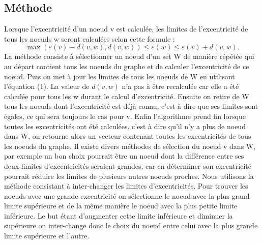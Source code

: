\documentclass[11pt]{article}
\begin{document}
\subsection{Méthode}
Lorsque l'excentricité d'un noeud v est calculée, les limites de l'excentricité
de tous les noeuds w seront calculées selon cette formule :
\begin{equation}
    \max(\varepsilon(v) - d(v, w), d(v, w)) \boldsymbol{\leq} \varepsilon(w)
    \boldsymbol{\leq} \varepsilon(v) + d(v, w).
\end{equation}
La méthode consiste à sélectionner un noeud d'un set W de manière répétée qui au
départ contient tous les noeuds du graphe et de calculer l'excentricité de ce
noeud. Puis on met à jour les limites de tous les noeuds de W en utilisant
l'équation (1). La valeur de $d(v, w)$ n'a pas à être recalculée car elle a été
calculée pour tous les w durant le calcul d'excentricité.  Ensuite on retire de
W tous les noeuds dont l'excentricité est déjà connu, c'est à dire que ses
limites sont égales, ce qui sera toujours le cas pour v. Enfin l'algorithme
prend fin lorsque toutes les excentricités ont été calculées, c'est à dire qu'il
n'y a plus de noeud dans W, on retourne alors un vecteur contenant toutes les
excentricités de tous les noeuds du graphe. \newline Il existe divers méthodes
de sélection du noeud v dans W, par exemple un bon choix pourrait être un noeud
dont la différence entre ses deux limites d'excentricités seraient grandes, car
en déterminer son excentricité pourrait réduire les limites de plusieurs autres
noeuds proches. Nous utilisons la méthode consistant à inter-changer les limites
d'excentricités. Pour trouver les noeuds avec une grande excentricité on
sélectionne le noeud avec la plus grand limite supérieure et de la même manière
le noeud avec la plus petite limite inférieure. Le but étant d'augmenter cette
limite inférieure et diminuer la supérieure on inter-change donc le choix du
noeud entre celui avec la plus grande limite supérieure et l'autre.
\end{document}
